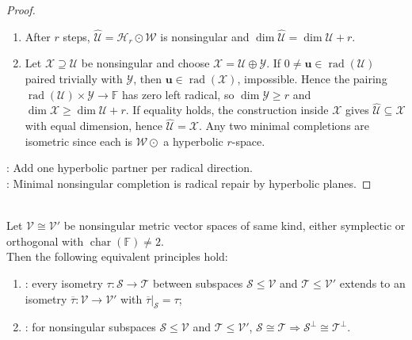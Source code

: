 \begin{theorem}
\begin{proof}
\begin{enumerate}[label=(\roman*)]
\item After $r$ steps, $\widehat{\mathcal{U}}=\mathcal{H}_{r}\odot\mathcal{W}$ is nonsingular and $\dim\widehat{\mathcal{U}}=\dim\mathcal{U}+r$.
\item Let $\mathcal{X}\supseteq\mathcal{U}$ be nonsingular and choose $\mathcal{X}=\mathcal{U}\oplus\mathcal{Y}$. If $0\neq\mathbf{u}\in\operatorname{rad}(\mathcal{U})$ paired trivially with $\mathcal{Y}$, then $\mathbf{u}\in\operatorname{rad}(\mathcal{X})$, impossible. Hence the pairing $\operatorname{rad}(\mathcal{U})\times\mathcal{Y}\to\mathbb{F}$ has zero left radical, so $\dim\mathcal{Y}\geq r$ and $\dim\mathcal{X}\geq\dim\mathcal{U}+r$. If equality holds, the construction inside $\mathcal{X}$ gives $\widehat{\mathcal{U}}\subseteq\mathcal{X}$ with equal dimension, hence $\widehat{\mathcal{U}}=\mathcal{X}$. Any two minimal completions are isometric since each is $\mathcal{W}\odot$ a hyperbolic $r$-space.
\end{enumerate}
: Add one hyperbolic partner per radical direction.\\
: Minimal nonsingular completion is radical repair by hyperbolic planes.
\end{proof}
\end{theorem}

\begin{principle} \label{princ:witt-extension-cancellation-metric-spaces} \\
Let $\mathcal{V}\cong\mathcal{V}'$ be nonsingular metric vector spaces of same kind, either symplectic or orthogonal with $\operatorname{char}(\mathbb{F})\neq2$.\\
Then the following equivalent principles hold:
\begin{enumerate}[label=(\roman*)]
\setlength{\itemsep}{0pt}
\item {}: every isometry $\tau:\mathcal{S}\to\mathcal{T}$ between subspaces $\mathcal{S}\leq\mathcal{V}$ and $\mathcal{T}\leq\mathcal{V}'$ extends to an isometry $\overline{\tau}:\mathcal{V}\to\mathcal{V}'$ with $\overline{\tau}|_{\mathcal{S}}=\tau$;
\item {}: for nonsingular subspaces $\mathcal{S}\leq\mathcal{V}$ and $\mathcal{T}\leq\mathcal{V}'$, $\mathcal{S}\cong\mathcal{T}\Rightarrow\mathcal{S}^{\perp}\cong\mathcal{T}^{\perp}$.
\end{enumerate}
\end{principle}

